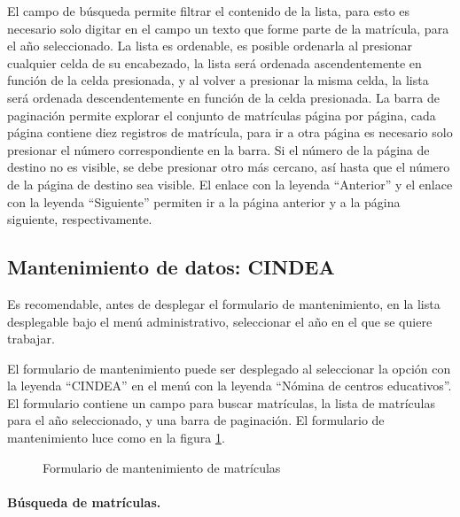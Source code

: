 \documentclass[a4paper, 9pt, conference]{article}              %
\begin{document}
El campo de b\'usqueda permite filtrar el contenido de la lista, para esto es necesario solo digitar en el campo un texto que forme parte de la matr\'icula, para el a\~no seleccionado. La lista es ordenable, es posible ordenarla al presionar cualquier celda de su encabezado, la lista ser\'a ordenada ascendentemente en funci\'on de la celda presionada, y al volver a presionar la misma celda, la lista ser\'a ordenada descendentemente en funci\'on de la celda presionada. La barra de paginaci\'on permite explorar el conjunto de matr\'iculas p\'agina por p\'agina, cada p\'agina contiene diez registros de matr\'icula, para ir a otra p\'agina es necesario solo presionar el n\'umero correspondiente en la barra. Si el n\'umero de la p\'agina de destino no es visible, se debe presionar otro m\'as cercano, as\'i hasta que el n\'umero de la p\'agina de destino sea visible. El enlace con la leyenda ``Anterior'' y el enlace con la leyenda ``Siguiente'' permiten ir a la p\'agina anterior y a la p\'agina siguiente, respectivamente.


\subsection{Mantenimiento de datos: CINDEA}
Es recomendable, antes de desplegar el formulario de mantenimiento, en la lista desplegable bajo el men\'u administrativo, seleccionar el a\~no en el que se quiere trabajar.

El formulario de mantenimiento puede ser desplegado al seleccionar la opci\'on con la leyenda ``CINDEA'' en el men\'u con la leyenda ``N\'omina de centros educativos''. El formulario contiene un campo para buscar matr\'iculas, la lista de matr\'iculas para el a\~no seleccionado, y una barra de paginaci\'on. El formulario de mantenimiento luce como en la figura \ref{fig:geoenrollments9}.

\begin{figure}
	\centering
		\caption{Formulario de mantenimiento de matr\'iculas}
	\label{fig:geoenrollments9}
\end{figure}


\paragraph{B\'usqueda de matr\'iculas.}
\end{document}
